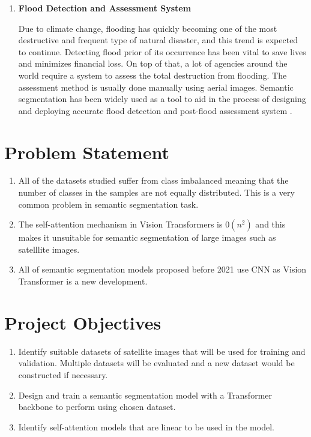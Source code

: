 \begin{enumerate}
    \item \textbf{Flood Detection and Assessment System}
    
    Due to climate change, flooding has quickly becoming one of the most destructive and frequent type of natural disaster, and this trend is expected to continue. Detecting flood prior of its occurrence has been vital to save lives and minimizes financial loss. On top of that, a lot of agencies around the world require a system to assess the total  destruction from flooding. The assessment method is usually done manually using aerial images. Semantic segmentation has been widely used as a tool to aid in the process of designing and deploying accurate flood detection and post-flood assessment system \cite{edseee.988427220220717}. 
\end{enumerate}

\section{Problem Statement}

\begin{enumerate}
    \item All of the datasets studied suffer from class imbalanced meaning that the number of classes in the samples are not equally distributed. This is a very common problem in semantic segmentation task.
    \item The self-attention mechanism in Vision Transformers is $0(n^2)$ and this makes it unsuitable for semantic segmentation of large images such as satelllite images.
    \item All of semantic segmentation models proposed before 2021 use CNN as Vision Transformer is a new development.  

\end{enumerate}


\section{Project Objectives}
\begin{enumerate}
    \item Identify suitable datasets of satellite images that will be used for training and validation. Multiple datasets will be evaluated and a new dataset would be constructed if necessary.
    \item Design and train a semantic segmentation model with a Transformer backbone to perform using chosen dataset.
    \item Identify self-attention models that are linear to be used in the model.
\end{enumerate}
